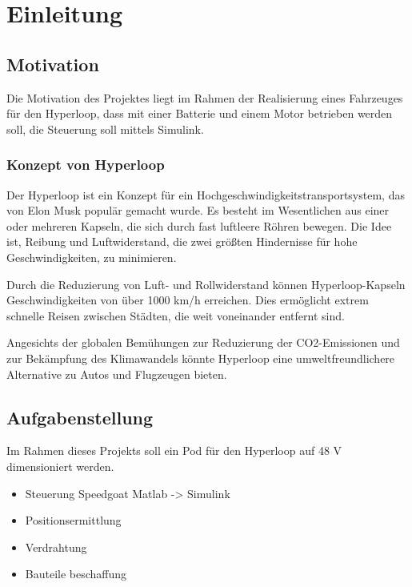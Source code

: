 \chapter{Einleitung}

\section{Motivation}

Die Motivation des Projektes liegt im Rahmen der Realisierung eines Fahrzeuges für den Hyperloop, dass mit einer Batterie und einem Motor betrieben werden soll, die Steuerung soll mittels Simulink.

\subsection{Konzept von Hyperloop}
Der Hyperloop ist ein Konzept für ein Hochgeschwindigkeitstransportsystem, das von Elon Musk populär gemacht wurde. Es besteht im Wesentlichen aus einer oder mehreren Kapseln, die sich durch fast luftleere Röhren bewegen. Die Idee ist, Reibung und Luftwiderstand, die zwei größten Hindernisse für hohe Geschwindigkeiten, zu minimieren.

Durch die Reduzierung von Luft- und Rollwiderstand können Hyperloop-Kapseln Geschwindigkeiten von über 1000 km/h erreichen. Dies ermöglicht extrem schnelle Reisen zwischen Städten, die weit voneinander entfernt sind.

Angesichts der globalen Bemühungen zur Reduzierung der CO2-Emissionen und zur Bekämpfung des Klimawandels könnte Hyperloop eine umweltfreundlichere Alternative zu Autos und Flugzeugen bieten.\newline




\section{Aufgabenstellung}

Im Rahmen dieses Projekts soll ein Pod für den Hyperloop auf 48 V dimensioniert werden.

\begin{itemize}
	\item Steuerung
	      \subitem Speedgoat
	      \subitem Matlab -> Simulink
	\item Positionsermittlung
	\item Verdrahtung
	\item Bauteile beschaffung
\end{itemize}

